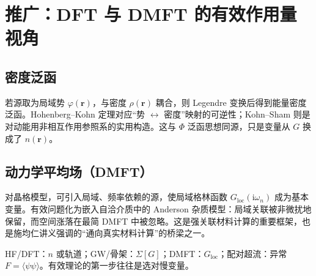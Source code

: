 \section{推广：DFT 与 DMFT 的有效作用量视角}

\subsection{密度泛函}

若源取为局域势 $\varphi(\mathbf{r})$，与密度 $\rho(\mathbf{r})$ 耦合，则 Legendre 变换后得到能量密度泛函。Hohenberg--Kohn 定理对应“势 $\leftrightarrow$ 密度”映射的可逆性；Kohn--Sham 则是对动能用非相互作用参照系的实用构造。这与 $\Phi$ 泛函思想同源，只是变量从 $G$ 换成了 $n(\mathbf{r})$。

\subsection{动力学平均场（DMFT）}

对晶格模型，可引入局域、频率依赖的源，使局域格林函数 $G_{\mathrm{loc}}(\mathrm{i}\omega_n)$ 成为基本变量。有效问题化为嵌入自洽介质中的 Anderson 杂质模型：局域关联被非微扰地保留，而空间涨落在最简 DMFT 中被忽略。这是强关联材料计算的重要框架，也是施均仁讲义强调的“通向真实材料计算”的桥梁之一。

\begin{example}[变量选择]
HF/DFT：$n$ 或轨道；GW/骨架：$\Sigma[G]$；DMFT：$G_{\mathrm{loc}}$；配对超流：异常 $F=\langle\psi\psi\rangle$。有效理论的第一步往往是选对慢变量。
\end{example}
